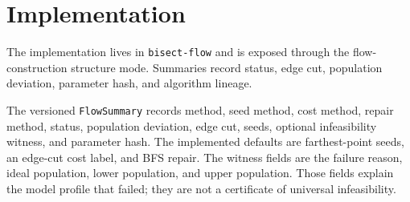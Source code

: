 \section{Implementation}

The implementation lives in \texttt{bisect-flow} and is exposed through
the flow-construction structure mode. Summaries record status, edge cut,
population deviation, parameter hash, and algorithm lineage.

The versioned \texttt{FlowSummary} records method, seed method, cost method,
repair method, status, population deviation, edge cut, seeds, optional
infeasibility witness, and parameter hash. The implemented defaults are
farthest-point seeds, an edge-cut cost label, and BFS repair. The witness fields
are the failure reason, ideal population, lower population, and upper population.
Those fields explain the model profile that failed; they are not a certificate
of universal infeasibility.
